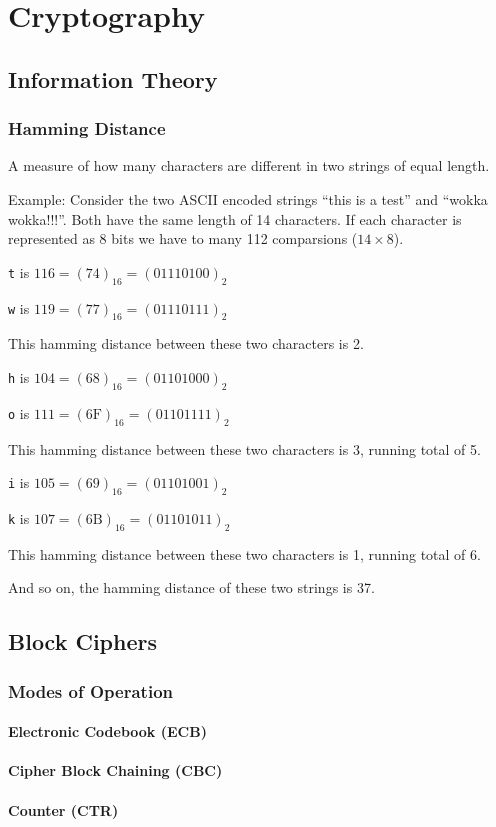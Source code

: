 \chapter{Cryptography}

\section{Information Theory}

\subsection{Hamming Distance}

A measure of how many characters are different in two strings of equal length.

Example: Consider the two ASCII encoded strings ``this is a test'' and ``wokka
wokka!!!''. Both have the same length of 14 characters. If each character is
represented as 8 bits we have to many 112 comparsions ($14 \times 8$).

\texttt{t} is $116 = (74)_{16} = (01110100)_{2}$

\texttt{w} is $119 = (77)_{16} = (01110111)_{2}$

This hamming distance between these two characters is 2.

\texttt{h} is $104 = (68)_{16} = (01101000)_{2}$

\texttt{o} is $111 = (6\text{F})_{16} = (01101111)_{2}$

This hamming distance between these two characters is 3, running total of 5.

\texttt{i} is $105 = (69)_{16} = (01101001)_{2}$

\texttt{k} is $107 = (6\text{B})_{16} = (01101011)_{2}$

This hamming distance between these two characters is 1, running total of 6.

And so on, the hamming distance of these two strings is 37.

\section{Block Ciphers}

\subsection{Modes of Operation}

\subsubsection{Electronic Codebook (ECB)}

\subsubsection{Cipher Block Chaining (CBC)}

\subsubsection{Counter (CTR)}
